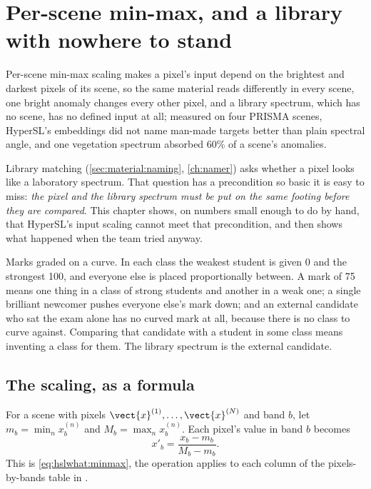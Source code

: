 \chapter{Per-scene min-max, and a library with nowhere to stand}\label{ch:hslnorm}
\def\tbrk{\hfil\penalty50\hfilneg}%

\begin{onething}
Per-scene min-max scaling makes a pixel's input depend on the brightest and darkest pixels of its scene, so the same
material reads differently in every scene, one bright anomaly changes every other pixel, and a library spectrum, which
has no scene, has no defined input at all; measured on four PRISMA scenes, HyperSL's embeddings did not name man-made
targets better than plain spectral angle, and one vegetation spectrum absorbed 60\% of a scene's anomalies.
\end{onething}

Library matching (\cref{sec:material:naming}, \cref{ch:namer}) asks whether a pixel looks like a laboratory spectrum.
That question has a precondition so basic it is easy to miss: \emph{the pixel and the library spectrum must be put on
the same footing before they are compared}. This chapter shows, on numbers small enough to do by hand, that HyperSL's
input scaling cannot meet that precondition, and then shows what happened when the team tried anyway.

\begin{analogy}
Marks graded on a curve. In each class the weakest student is given 0 and the strongest 100, and everyone else is
placed proportionally between. A mark of 75 means one thing in a class of strong students and another in a weak one;
a single brilliant newcomer pushes everyone else's mark down; and an external candidate who sat the exam alone has no
curved mark at all, because there is no class to curve against. Comparing that candidate with a student in some class
means inventing a class for them. The library spectrum is the external candidate.
\end{analogy}

\section{The scaling, as a formula}\label{sec:hslnorm:formula}

\begin{definition}
For a scene with pixels $\vect{x}^{(1)},\dots,\vect{x}^{(N)}$ and band $b$, let
$m_b=\min_n x^{(n)}_b$ and $M_b=\max_n x^{(n)}_b$. Each pixel's value in band $b$ becomes
\begin{equation}
x'_b=\frac{x_b-m_b}{M_b-m_b}. \label{eq:hslnorm:minmax}
\end{equation}
This is \cref{eq:hslwhat:minmax}, the operation  applies to each column of the
pixels-by-bands table in .
\end{definition}

